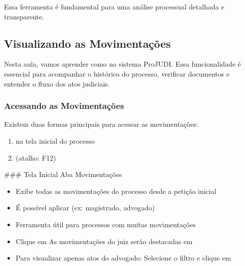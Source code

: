 \documentclass[letterpaper,10pt,brazil]{sphinxmanual}
\begin{document}
\sphinxAtStartPar
Essa ferramenta é fundamental para uma análise processual detalhada e transparente.

\sphinxstepscope


\subsection{Visualizando as Movimentações}
\label{\detokenize{projud_17_visualizandomovimentos:visualizando-as-movimentacoes}}\label{\detokenize{projud_17_visualizandomovimentos::doc}}
\sphinxAtStartPar
Nesta aula, vamos aprender como  no sistema ProJUDI. Essa funcionalidade é essencial para acompanhar o histórico do processo, verificar documentos e entender o fluxo dos atos judiciais.


\subsubsection{Acessando as Movimentações}
\label{\detokenize{projud_17_visualizandomovimentos:acessando-as-movimentacoes}}
\sphinxAtStartPar
Existem duas formas principais para acessar as movimentações:
\begin{enumerate}
%
\item {} 
\sphinxAtStartPar
{} na tela inicial do processo

\item {} 
\sphinxAtStartPar
{} (atalho: F12)

\end{enumerate}

\sphinxAtStartPar
\#\#\# Tela Inicial \textendash{} Aba Movimentações
\begin{itemize}
\item {} 
\sphinxAtStartPar
Exibe todas as movimentações do processo desde a petição inicial

\item {} 
\sphinxAtStartPar
É possível aplicar  (ex: magistrado, advogado)

\item {} 
\sphinxAtStartPar
Ferramenta útil para processos com muitas movimentações

\end{itemize}

\sphinxAtStartPar
{}
\begin{itemize}
\item {} 
\sphinxAtStartPar
Clique em 
\sphinxhyphen{} As movimentações do juiz serão destacadas em 

\item {} 
\sphinxAtStartPar
Para visualizar apenas atos do advogado:
\sphinxhyphen{} Selecione o filtro e clique em 

\end{itemize}
\end{document}
